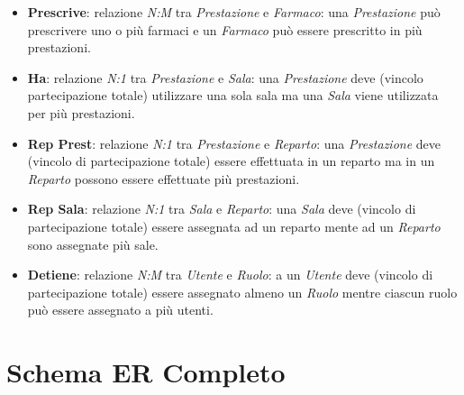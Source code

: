 \documentclass[paper=a4, fontsize=11pt,x11names]{report}
\begin{document}
\begin{itemize}
\item \textbf{Prescrive}: relazione \textit{N:M} tra \textit{Prestazione} e \textit{Farmaco}: una \textit{Prestazione} può prescrivere uno o più farmaci e un \textit{Farmaco} può essere prescritto in più prestazioni.
\item \textbf{Ha}: relazione \textit{N:1} tra \textit{Prestazione} e \textit{Sala}: una \textit{Prestazione} deve (vincolo partecipazione totale) utilizzare una sola sala ma una \textit{Sala} viene utilizzata per più prestazioni.
\item \textbf{Rep Prest}: relazione \textit{N:1} tra \textit{Prestazione} e \textit{Reparto}: una \textit{Prestazione} deve (vincolo di partecipazione totale) essere effettuata in un reparto ma in un \textit{Reparto} possono essere effettuate più prestazioni.
\item \textbf{Rep Sala}: relazione \textit{N:1} tra \textit{Sala} e \textit{Reparto}: una \textit{Sala} deve (vincolo di partecipazione totale) essere assegnata ad un reparto mente ad un \textit{Reparto} sono assegnate più sale. 
\item \textbf{Detiene}: relazione \textit{N:M} tra \textit{Utente} e \textit{Ruolo}: a un \textit{Utente} deve (vincolo di partecipazione totale) essere assegnato almeno un \textit{Ruolo} mentre ciascun ruolo può essere assegnato a più utenti. 
\end{itemize}


\section{Schema ER Completo}
\end{document}
